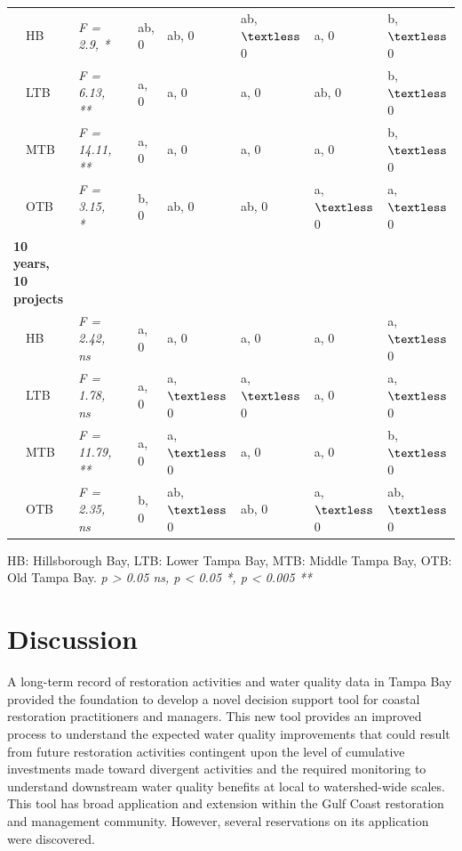\documentclass[]{article}
\begin{document}
\begin{table}[!tbp]
\begin{center}
\begin{tabular}{llclllll}
~~HB&\textit{F = 2.9, *}&&ab, 0&ab, 0&ab, $\textless $ 0&a, 0&b, $\textless $ 0\tabularnewline
~~LTB&\textit{F = 6.13, **}&&a, 0&a, 0&a, 0&ab, 0&b, $\textless $ 0\tabularnewline
~~MTB&\textit{F = 14.11, **}&&a, 0&a, 0&a, 0&a, 0&b, $\textless $ 0\tabularnewline
~~OTB&\textit{F = 3.15, *}&&b, 0&ab, 0&ab, 0&a, $\textless $ 0&a, $\textless $ 0\tabularnewline
\hline
{\bfseries 10 years, 10 projects}&&&&&&&\tabularnewline
~~HB&\textit{F = 2.42, ns}&&a, 0&a, 0&a, 0&a, 0&a, $\textless $ 0\tabularnewline
~~LTB&\textit{F = 1.78, ns}&&a, 0&a, $\textless $ 0&a, $\textless $ 0&a, 0&a, $\textless $ 0\tabularnewline
~~MTB&\textit{F = 11.79, **}&&a, 0&a, $\textless $ 0&a, 0&a, 0&b, $\textless $ 0\tabularnewline
~~OTB&\textit{F = 2.35, ns}&&b, 0&ab, $\textless $ 0&ab, 0&a, $\textless $ 0&ab, $\textless $ 0\tabularnewline
\hline
\end{tabular}\end{center}
\footnotesize HB: Hillsborough Bay, LTB: Lower Tampa Bay, MTB: Middle Tampa Bay, OTB: Old Tampa Bay. \textit{p > 0.05 ns, p < 0.05 *, p < 0.005 **}\end{table}

\hypertarget{discussion}{%
\section{Discussion}\label{discussion}}

A long-term record of restoration activities and water quality data in
Tampa Bay provided the foundation to develop a novel decision support
tool for coastal restoration practitioners and managers. This new tool
provides an improved process to understand the expected water quality
improvements that could result from future restoration activities
contingent upon the level of cumulative investments made toward
divergent activities and the required monitoring to understand
downstream water quality benefits at local to watershed-wide scales.
This tool has broad application and extension within the Gulf Coast
restoration and management community. However, several reservations on
its application were discovered.
\end{document}
